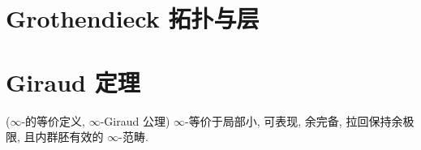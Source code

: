 \section{Grothendieck 拓扑与层}


\section{Giraud 定理}

\begin{prop}
	{($\infty$-\topos{}的等价定义, $\infty$-Giraud 公理)}
	$\infty$-\topos{}等价于局部小, 可表现, 余完备, 拉回保持余极限, 且内群胚有效的 $\infty$-范畴.
\end{prop}

